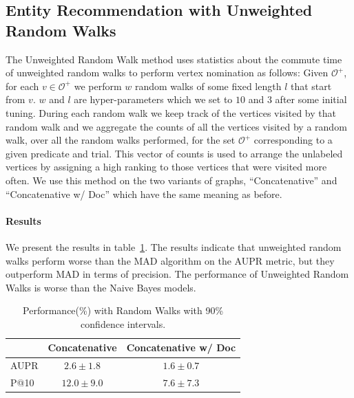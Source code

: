 \documentclass[paper=a4,fontsize=11pt]{scrartcl}
\newcommand{\tabref}[1]{table~\ref{#1}}
\numberwithin{equation}{section}    %
\numberwithin{figure}{section}      %
\numberwithin{table}{section}       %
\begin{document}
\subsection{Entity Recommendation with Unweighted Random Walks}
\label{sec:er-rw}
The Unweighted Random Walk method uses statistics about the commute
time of unweighted random walks to perform vertex nomination as follows:
Given $\mathcal{O}^{+}$, for each $v \in \mathcal{O}^{+}$ we perform $w$ random walks
of some fixed length $l$ that start from $v$. $w$ and $l$ are hyper-parameters which
we set to $10$ and $3$ after some initial tuning. During each random walk we keep
track of the vertices visited by that random walk and we aggregate the counts of all
the vertices visited by a random walk, over all the random walks performed,
for the set $\mathcal{O}^{+}$ corresponding to a given predicate and trial.
This vector of counts is used to arrange the unlabeled vertices
by assigning a high ranking to those vertices that were visited more often.
We use this method on the two variants of graphs, ``Concatenative'' and ``Concatenative w/ Doc''
which have the same meaning as before.

\paragraph{Results} We present the results in \tabref{tab:perf-rw}.
The results indicate that unweighted random walks perform
worse than the MAD algorithm on the AUPR metric, but they outperform MAD in terms of precision.
The performance of Unweighted Random Walks is worse than the Naive Bayes models.
\begin{table}[htbp]
  \centering
  \begin{tabular}{l | c c}
         & Concatenative & Concatenative w/ Doc \\\hline
    AUPR & $ 2.6 \pm 1.8 $       & $ 1.6 \pm 0.7 $      \\
    P@10 & $ 12.0 \pm 9.0 $      & $ 7.6 \pm 7.3 $      \\
  \end{tabular}
  \caption{Performance(\%) with Random Walks with 90\% confidence intervals.}
  \label{tab:perf-rw}
\end{table}

\end{document}
